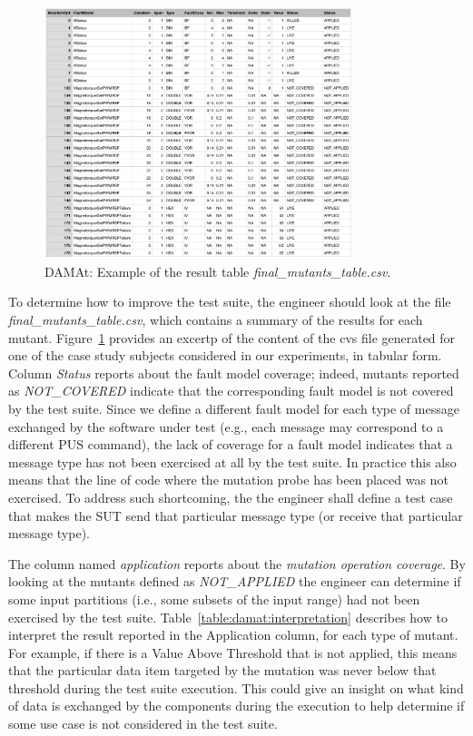  \begin{figure}[h]
\begin{center}
\includegraphics[width=0.8\textwidth]{images/DAMAtADCS.png}
\caption{DAMAt: Example of the result table \emph{final\_mutants\_table.csv}.}
\label{fig:damat:example:result:table}
\end{center}
\end{figure}

To determine how to improve the test suite, the engineer should look at the file \emph{final\_mutants\_table.csv}, which contains a summary of the results for each mutant. Figure~\ref{fig:damat:example:result:table} provides an excertp of the content of the cvs file generated for one of the case study subjects considered in our experiments, in tabular form. Column \emph{Status} reports about  the fault model coverage; indeed, mutants reported as \emph{NOT\_COVERED} indicate that the corresponding fault model is not covered by the test suite. Since we define a different fault model for each type of message exchanged by the software under test (e.g., each message may correspond to a different PUS command), the lack of coverage for a fault model indicates that a message type has not been exercised at all by the test suite. In practice this also means that the line of code where the mutation probe has been placed was not exercised.
To address such shortcoming, the the engineer shall define a test case that makes the SUT send that particular message type (or receive that particular message type).

The column named \emph{application} reports about the \emph{mutation operation coverage}. By looking at the mutants defined as \emph{NOT\_APPLIED} the engineer can determine if some input partitions (i.e., some subsets of the input range) had not been exercised by the test suite. Table~\ref{table:damat:interpretation} describes how to interpret the result reported in the Application column, for each type of mutant.
For example, if there is a Value Above Threshold that is not applied, this means that the particular data item targeted by the mutation was never below that threshold during the test suite execution.
This could give an insight on what kind of data is exchanged by the components during the execution to help determine if some use case is not considered in the test suite.


